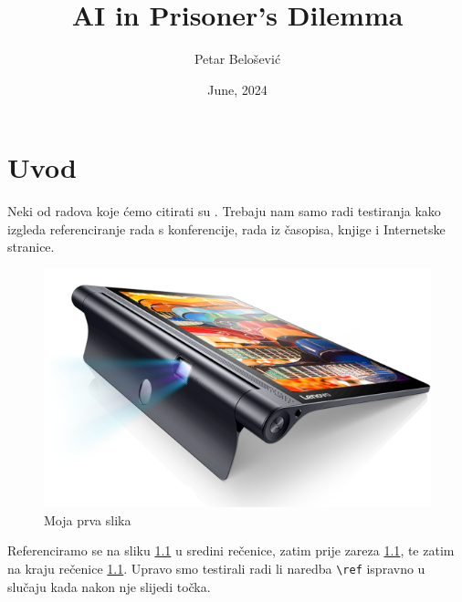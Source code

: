 \documentclass[zavrsnirad]{fer}
\title{AI in Prisoner's Dilemma}
\author{Petar Belošević}
\date{June, 2024}
\begin{document}
\maketitle






\begin{zahvale}
\end{zahvale}


\mainmatter


\tableofcontents


\chapter{Uvod}
\label{pog:uvod}

Neki od radova koje ćemo citirati su \cite{6248073,6247753,ghiglia_pritt_phase_unwrapping,hartley2003multiple,4250461,123DCatch}.
Trebaju nam samo radi testiranja kako izgleda referenciranje rada s konferencije, rada iz časopisa, knjige i Internetske stranice.

\begin{figure}[htb]
  \centering
  \includegraphics[width=0.38\linewidth]{Extra/lenovo_yoga_tab3_pro_front.png} 
  \caption{Moja prva slika}
  \label{slk:prvaslika}
\end{figure}

Referenciramo se na sliku \ref{slk:prvaslika} u sredini rečenice, zatim prije zareza \ref{slk:prvaslika}, te zatim na kraju rečenice \ref{slk:prvaslika}.
Upravo smo testirali radi li naredba \verb|\ref| ispravno u slučaju kada nakon nje slijedi točka.
\end{document}
